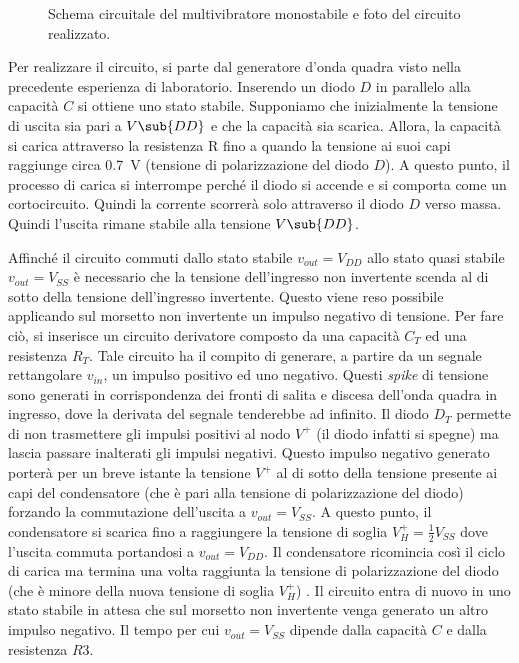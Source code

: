 \begin{figure}[h]
\begin{minipage}{.45\textwidth}
	\end{minipage}
	\caption{Schema circuitale del multivibratore monostabile e foto del circuito realizzato.}
	\label{fig:circuito_1}
\end{figure}
Per realizzare il circuito, si parte dal generatore d'onda quadra visto nella precedente esperienza di laboratorio. Inserendo un diodo $D$ in parallelo alla capacità $C$ si ottiene uno stato stabile. Supponiamo che inizialmente la tensione di uscita sia pari a $V\sub{DD}$ e che la capacità sia scarica. Allora, la capacità si carica attraverso la resistenza R fino a quando la tensione ai suoi capi raggiunge circa \SI{0.7}{\volt} (tensione di polarizzazione del diodo $D$). A questo punto, il processo di carica si interrompe perché il diodo si accende e si comporta come un cortocircuito. Quindi la corrente scorrerà solo attraverso il diodo $D$ verso massa. Quindi l'uscita rimane stabile alla tensione $V\sub{DD}$.

\noindent
Affinché il circuito commuti dallo stato stabile $v_{out}=V_{DD}$ allo stato quasi stabile $v_{out}=V_{SS}$ è necessario che la tensione dell'ingresso non invertente scenda al di sotto della tensione dell'ingresso invertente. Questo viene reso possibile applicando sul morsetto non invertente un impulso negativo di tensione. Per fare ciò, si inserisce un circuito derivatore composto da una capacità $C_T$ ed una resistenza $R_T$. Tale circuito ha il compito di generare, a partire da un segnale rettangolare $v_{in}$, un impulso positivo ed uno negativo. Questi \textit{spike} di tensione sono generati in corrispondenza dei fronti di salita e discesa dell'onda quadra in ingresso, dove la derivata del segnale tenderebbe ad infinito. Il diodo $D_T$ permette di non trasmettere gli impulsi positivi al nodo $V^+$ (il diodo infatti si spegne) ma lascia passare inalterati gli impulsi negativi.
Questo impulso negativo generato porterà per un breve istante la tensione $V^+$ al di sotto della tensione presente ai capi del condensatore (che è pari alla tensione di polarizzazione del diodo) forzando la commutazione dell'uscita a $v_{out}=V_{SS}$. A questo punto, il condensatore si scarica fino a raggiungere la tensione di soglia $V_H^+=\frac{1}{2}V_{SS}$ dove l'uscita commuta portandosi a $v_{out}=V_{DD}$. Il condensatore ricomincia così il ciclo di carica ma termina una volta raggiunta la tensione di polarizzazione del diodo (che è minore della nuova tensione di soglia $V_H^+$) . Il circuito entra di nuovo in uno stato stabile in attesa che sul morsetto non invertente venga generato un altro impulso negativo. Il tempo per cui $v_{out}=V_{SS}$ dipende dalla capacità $C$ e dalla resistenza $R3$.

